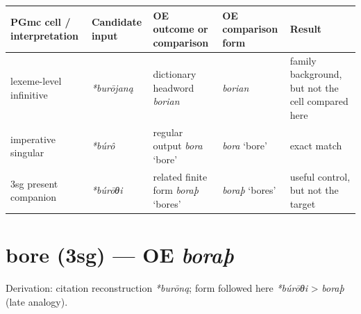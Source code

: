 \documentclass[
  british,
  a4paper,
  openany]{book}
\newcounter{none} %
\providecommand{\texorpdfstring}[2]{#1}
\begin{document}
{\def\LTcaptype{none} %
\begin{longtable}[]{@{}
  >{\raggedright\arraybackslash}p{}
  >{\raggedright\arraybackslash}p{}
  >{\raggedright\arraybackslash}p{}
  >{\raggedright\arraybackslash}p{}
  >{\raggedright\arraybackslash}p{}@{}}
\toprule\noalign{}
\begin{minipage}[b]{\linewidth}\raggedright
PGmc cell / interpretation
\end{minipage} & \begin{minipage}[b]{\linewidth}\raggedright
Candidate input
\end{minipage} & \begin{minipage}[b]{\linewidth}\raggedright
OE outcome or comparison
\end{minipage} & \begin{minipage}[b]{\linewidth}\raggedright
OE comparison form
\end{minipage} & \begin{minipage}[b]{\linewidth}\raggedright
Result
\end{minipage} \\
\midrule\noalign{}
\endhead
\bottomrule\noalign{}
\endlastfoot
lexeme-level infinitive & {\emph{*burōjaną}} & dictionary headword
{\emph{borian}} & {\emph{borian}} & family background, but not the cell
compared here \\
imperative singular & {\emph{*búrô}} & regular output {\emph{bora}}
`bore' & {\emph{bora}} `bore' & exact match \\
3sg present companion & {\emph{*búrōθi}} & related finite form
{\emph{boraþ}} `bores' & {\emph{boraþ}} `bores' & useful control, but
not the target \\
\end{longtable}
}

\section{\texorpdfstring{bore (3sg) --- OE
\emph{boraþ}}{bore (3sg) --- OE boraþ}}\label{bore-3sg-oe-borauxfe}


Derivation: citation reconstruction \emph{*burōną}; form followed here
\emph{*búrōθi} \textgreater{} \emph{boraþ} (late analogy).
\end{document}

